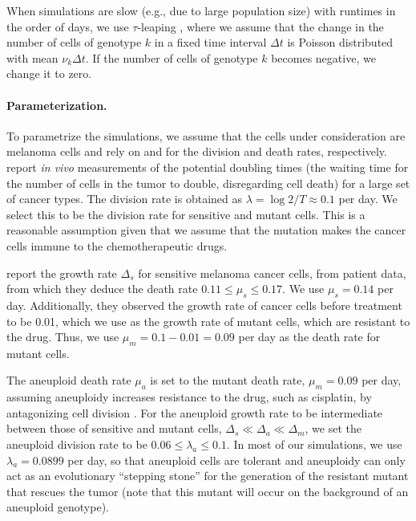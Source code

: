 \documentclass[12pt]{extarticle}
\begin{document}
When simulations are slow (e.g., due to large population size) with runtimes in the order of days, we use $\tau$-leaping \citep{gillespie2001approximate}, where we assume that the change in the number of cells of genotype $k$ in a fixed time interval $\Delta t$ is Poisson distributed with mean $\nu_k \Delta t$. If the number of cells of genotype $k$ becomes negative, we change it to zero. 


\paragraph{Parameterization.}
To parametrize the simulations, we assume that the cells under consideration are melanoma cells and rely on \citet{rew2000cell} and \citet{bozic2013evolutionary} for the division and death rates, respectively. 
\citet{rew2000cell} report \emph{in vivo} measurements of the potential doubling times (the waiting time for the number of cells in the tumor to double, disregarding cell death) for a large set of cancer types. The division rate is obtained as $\lambda=\log{2} / T \approx 0.1$ per day. We select this to be the division rate for sensitive and mutant cells. This is a reasonable assumption given that we assume that the mutation makes the cancer cells immune to the chemotherapeutic drugs. %

\citet{bozic2013evolutionary} report the growth rate $\Delta_s$ for sensitive melanoma cancer cells, from patient data, from which they deduce the death rate $0.11 \le \mu_s \le 0.17$. We use  $\mu_s=0.14$ per day. Additionally, they observed the growth rate of cancer cells before treatment to be 0.01, which we use as the growth rate of mutant cells, which are resistant to the drug. Thus, we use $\mu_m=0.1-0.01=0.09$ per day as the death rate for mutant cells. %

The aneuploid death rate $\mu_a$ is set to the mutant death rate, $\mu_m=0.09$ per day, assuming aneuploidy increases resistance to the drug, such as cisplatin, by antagonizing cell division \citep{replogle2020aneuploidy}.
For the aneuploid growth rate to be intermediate between those of sensitive and mutant cells, $\Delta_s\ll\Delta_a\ll\Delta_m$, we set the aneuploid division rate to be $0.06 \le \lambda_a \le 0.1$. %
In most of our simulations, we use $\lambda_a=0.0899$ per day, so that aneuploid cells are tolerant and aneuploidy can only act as an evolutionary ``stepping stone'' for the generation of the resistant mutant that rescues the tumor (note that this mutant will occur on the background of an aneuploid genotype).  
\end{document}
